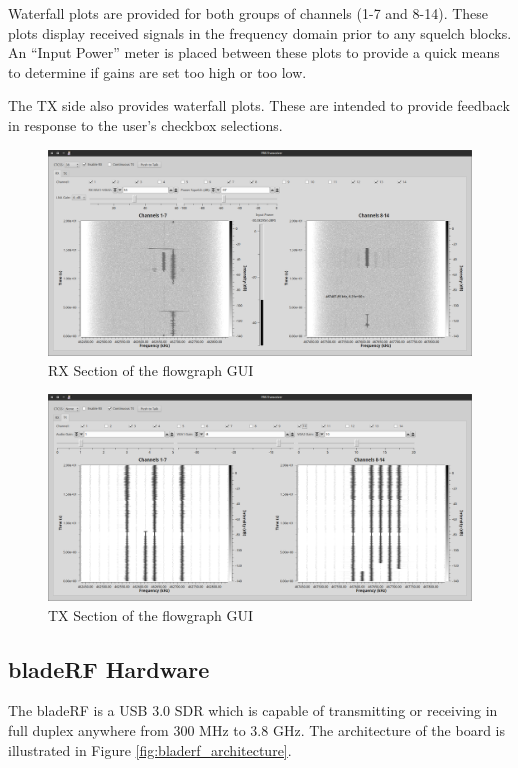 Waterfall plots are provided for both groups of channels (1-7 and 8-14). These plots
display received signals in the frequency domain prior to any squelch blocks.
An ``Input Power'' meter is placed between these plots to provide a quick means
to determine if gains are set too high or too low.

The \ac{TX} side also provides waterfall plots. These are intended to provide
feedback in response to the user's checkbox selections.

\begin{figure}[h!]
  \centering
  \includegraphics[width=6.5in]{images/frs/gui_rx.png}
  \caption{RX Section of the flowgraph GUI}
  \label{fig:gui_rx}
\end{figure}

\begin{figure}[h!]
  \centering
  \includegraphics[width=6.5in]{images/frs/gui_tx.png}
  \caption{TX Section of the flowgraph GUI}
  \label{fig:gui_tx}
\end{figure}

\subsection{bladeRF Hardware}
The bladeRF is a USB 3.0 \ac{SDR} which is capable of transmitting or receiving
in full duplex anywhere from 300 MHz to 3.8 GHz. The architecture of the board
is illustrated in Figure \ref{fig:bladerf_architecture}.

